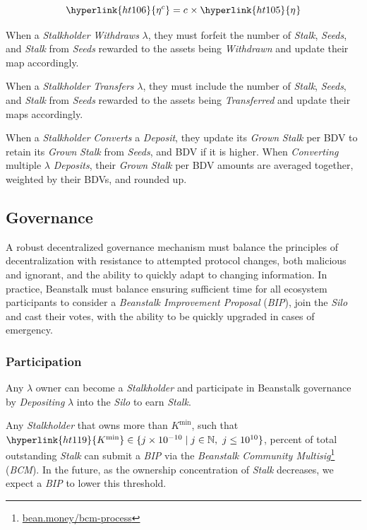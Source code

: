 \documentclass[tikz]{article}
\newcommand{\term}[1]{\textsl{#1}}
\newcommand{\fref}[1]{\footnote{\href{http://#1}{#1}}}
\newcommand{\bean}{} %
\begin{document}
    $$
        \hyperlink{ht106}{\eta^{c}} = c^{\bean} \times \hyperlink{ht105}{\eta^{\bean}}
    $$
    
When a \term{Stalkholder} \term{Withdraws} \hyperlink{ht126}{$\lambda$}, they must forfeit the number of \term{Stalk}, \term{Seeds}, and \term{Stalk} from \term{Seeds} rewarded to the assets being \term{Withdrawn} and update their map accordingly.

When a \term{Stalkholder} \term{Transfers} \hyperlink{ht126}{$\lambda$}, they must include the number of \term{Stalk}, \term{Seeds}, and \term{Stalk} from \term{Seeds} rewarded to the assets being \term{Transferred} and update their maps accordingly.

When a \term{Stalkholder} \term{Converts} a \term{Deposit}, they update its \term{Grown} \term{Stalk} per BDV to retain its \term{Grown} \term{Stalk} from \term{Seeds}, and BDV if it is higher. When \term{Converting} multiple \hyperlink{ht126}{$\lambda$} \term{Deposits}, their \term{Grown} \term{Stalk} per BDV amounts are averaged together, weighted by their BDVs, and rounded up.


\subsection{Governance}
\vspace*{-1mm}

A robust decentralized governance mechanism must balance the principles of decentralization with resistance to attempted protocol changes, both malicious and ignorant, and the ability to quickly adapt to changing information. In practice, Beanstalk must balance ensuring sufficient time for all ecosystem participants to consider a \term{Beanstalk Improvement Proposal} (\term{BIP}), join the \term{Silo} and cast their votes, with the ability to be quickly upgraded in cases of emergency. 

\subsubsection{Participation}
\vspace*{-1mm}

Any \hyperlink{ht126}{$\lambda$} owner can become a \term{Stalkholder} and participate in Beanstalk governance by \term{Depositing} \hyperlink{ht126}{$\lambda$} into the \term{Silo} to earn \term{Stalk}.

Any \term{Stalkholder} that owns more than \hyperlink{ht119}{$K^{\text{min}}$}, such that $\hyperlink{ht119}{K^{\text{min}}} \in \{j \times 10^{-10} \mid j \in \mathbb{N},\ j \leq 10^{10} \}$, percent of total outstanding \term{Stalk} can submit a \term{BIP} via the \term{Beanstalk Community Multisig}\fref{bean.money/bcm-process} (\term{BCM}). In the future, as the ownership concentration of \term{Stalk} decreases, we expect a \term{BIP} to lower this threshold.
\end{document}
